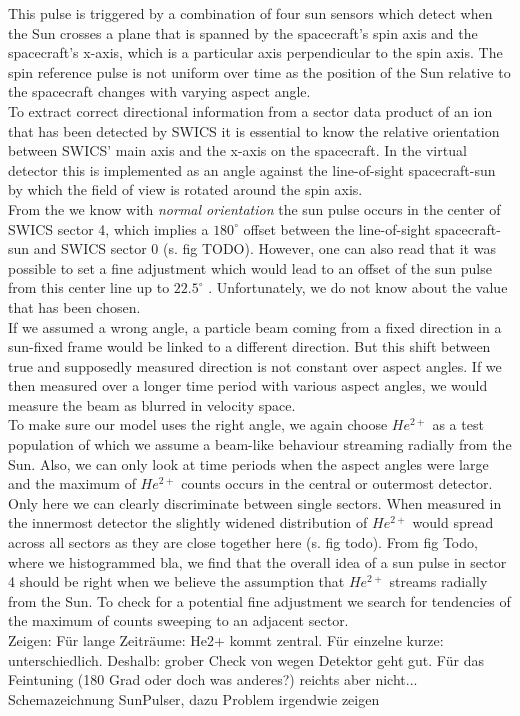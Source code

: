 This pulse is triggered by a combination of four sun sensors which detect when the Sun crosses a plane that is spanned by the spacecraft's spin axis and the spacecraft's x-axis, which is a particular axis perpendicular to the spin axis.
The spin reference pulse is not uniform over time as the position of the Sun relative to the spacecraft changes with varying aspect angle.\\
To extract correct directional information from a sector data product of an ion that has been detected by SWICS it is essential to know the relative orientation between SWICS' main axis and the x-axis on the spacecraft. In the virtual detector this is implemented as an angle against the line-of-sight spacecraft-sun by which the field of view is rotated around the spin axis.\\
From the \citet[][S.20-22]{swics_dpu} we know with \textit{normal orientation} the sun pulse occurs in the center of SWICS sector 4, which implies a $180^\circ$ offset between the line-of-sight spacecraft-sun and SWICS sector 0 (s. fig TODO). However, one can also read that it was possible to set a fine adjustment which would lead to an offset of the sun pulse from this center line up to $22.5^\circ$ \citet[][S.48]{swics_dpu}. Unfortunately, we do not know about the value that has been chosen.
\\
If we assumed a wrong angle, a particle beam coming from a fixed direction in a sun-fixed frame would be linked to a different direction. But this shift between true and supposedly measured direction is not constant over aspect angles. If we then measured over a longer time period with various aspect angles, we would measure the beam as blurred in velocity space.
\\
To make sure our model uses the right angle, we again choose $He^{2+}$ as a test population of which we assume a beam-like behaviour streaming radially from the Sun. Also, we can only look at time periods when the aspect angles were large and the maximum of $He^{2+}$ counts occurs in the central or outermost detector. Only here we can clearly discriminate between single sectors. When measured in the innermost detector the slightly widened distribution of $He^{2+}$ would spread across all sectors as they are close together here (s. fig todo).
From fig Todo, where we histogrammed bla, we find that the overall idea of a sun pulse in sector 4 should be right when we believe the assumption that $He^{2+}$ streams radially from the Sun. To check for a potential fine adjustment we search for tendencies of the maximum of counts sweeping to an adjacent sector.
\\
Zeigen: Für lange Zeiträume: He2+ kommt zentral. Für einzelne kurze: unterschiedlich.
Deshalb: grober Check von wegen Detektor geht gut. Für das Feintuning (180 Grad oder doch was anderes?) reichts aber nicht...
\\
Schemazeichnung SunPulser, dazu Problem irgendwie zeigen

